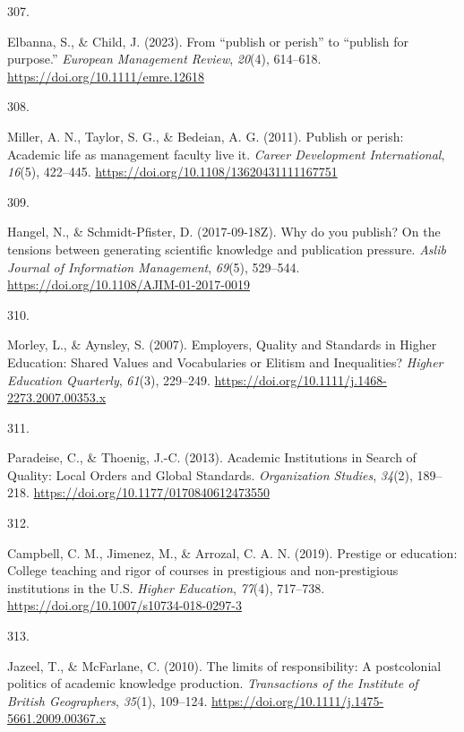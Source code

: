 \documentclass[
  11pt,
  letterpaper,
]{scrreprt}
\newlength{\cslhangindent}
\newlength{\csllabelwidth}
\newenvironment{CSLReferences}[2] %
 {\begin{list}{}{%
  \setlength{\itemindent}{0pt}
  \setlength{\leftmargin}{0pt}
  \setlength{\parsep}{0pt}
  \ifodd #1
   \setlength{\leftmargin}{\cslhangindent}
   \setlength{\itemindent}{-1\cslhangindent}
  \fi
  \setlength{\itemsep}{#2\baselineskip}}}
 {\end{list}}
\newcommand{\CSLLeftMargin}[1]{\parbox[t]{\csllabelwidth}{\strut#1\strut}}
\newcommand{\CSLRightInline}[1]{\parbox[t]{\linewidth - \csllabelwidth}{\strut#1\strut}}
\begin{document}
\begin{CSLReferences}{0}{0}
\CSLLeftMargin{307. }%
\CSLRightInline{Elbanna, S., \& Child, J. (2023). From {``publish or
perish''} to {``publish for purpose.''} \emph{European Management
Review}, \emph{20}(4), 614--618.
\url{https://doi.org/10.1111/emre.12618}}

\CSLLeftMargin{308. }%
\CSLRightInline{Miller, A. N., Taylor, S. G., \& Bedeian, A. G. (2011).
Publish or perish: Academic life as management faculty live it.
\emph{Career Development International}, \emph{16}(5), 422--445.
\url{https://doi.org/10.1108/13620431111167751}}

\CSLLeftMargin{309. }%
\CSLRightInline{Hangel, N., \& Schmidt-Pfister, D. (2017-09-18Z). Why do
you publish? {On} the tensions between generating scientific knowledge
and publication pressure. \emph{Aslib Journal of Information
Management}, \emph{69}(5), 529--544.
\url{https://doi.org/10.1108/AJIM-01-2017-0019}}

\CSLLeftMargin{310. }%
\CSLRightInline{Morley, L., \& Aynsley, S. (2007). Employers, {Quality}
and {Standards} in {Higher Education}: {Shared Values} and
{Vocabularies} or {Elitism} and {Inequalities}? \emph{Higher Education
Quarterly}, \emph{61}(3), 229--249.
\url{https://doi.org/10.1111/j.1468-2273.2007.00353.x}}

\CSLLeftMargin{311. }%
\CSLRightInline{Paradeise, C., \& Thoenig, J.-C. (2013). Academic
{Institutions} in {Search} of {Quality}: {Local Orders} and {Global
Standards}. \emph{Organization Studies}, \emph{34}(2), 189--218.
\url{https://doi.org/10.1177/0170840612473550}}

\CSLLeftMargin{312. }%
\CSLRightInline{Campbell, C. M., Jimenez, M., \& Arrozal, C. A. N.
(2019). Prestige or education: College teaching and rigor of courses in
prestigious and non-prestigious institutions in the {U}.{S}.
\emph{Higher Education}, \emph{77}(4), 717--738.
\url{https://doi.org/10.1007/s10734-018-0297-3}}

\CSLLeftMargin{313. }%
\CSLRightInline{Jazeel, T., \& McFarlane, C. (2010). The limits of
responsibility: A postcolonial politics of academic knowledge
production. \emph{Transactions of the Institute of British Geographers},
\emph{35}(1), 109--124.
\url{https://doi.org/10.1111/j.1475-5661.2009.00367.x}}


\end{CSLReferences}
\end{document}

